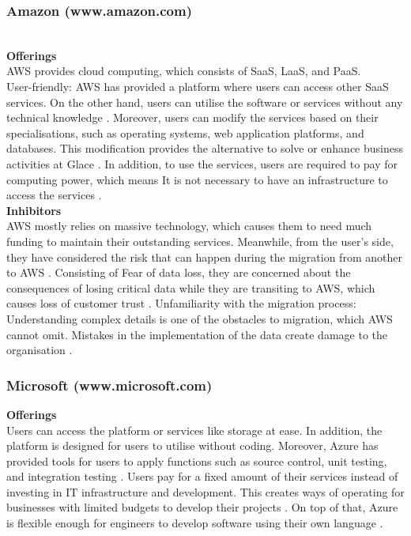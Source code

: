 \documentclass[12pt,a4paper]{article}
\begin{document}
\subsubsection{Amazon (www.amazon.com)} \\
\noindent\textbf{Offerings}\\
\noindent AWS provides cloud computing, which consists of SaaS, LaaS, and PaaS.\\ 
User-friendly: AWS has provided a platform where users can access other SaaS services. On the other hand, users can utilise the software or services without any technical knowledge \citep{question_3.5}. Moreover, users can modify the services based on their specialisations, such as operating systems, web application platforms, and databases. This modification provides the alternative to solve or enhance business activities at Glace \citep{question_3.6}. In addition, to use the services, users are required to pay for computing power, which means It is not necessary to have an infrastructure to access the services \citep{question_3.6}. \\

\noindent\textbf{Inhibitors }\\
\noindent AWS mostly relies on massive technology, which causes them to need much funding to maintain their outstanding services. Meanwhile, from the user’s side, they have considered the risk that can happen during the migration from another to AWS \citep{question_3.7}. Consisting of Fear of data loss, they are concerned about the consequences of losing critical data while they are transiting to AWS, which causes loss of customer trust \citep{question_3.7}. 
Unfamiliarity with the migration process: Understanding complex details is one of the obstacles to migration, which AWS cannot omit. Mistakes in the implementation of the data create damage to the organisation \citep{question_3.7}.


\subsubsection{Microsoft (www.microsoft.com) } 
\noindent\textbf{Offerings}\\
Users can access the platform or services like storage at ease. In addition, the platform is designed for users to utilise without coding. Moreover, Azure has provided tools for users to apply functions such as source control, unit testing, and integration testing \citep{question_3.8}. Users pay for a fixed amount of their services instead of investing in IT infrastructure and development. This creates ways of operating for businesses with limited budgets to develop their projects \citep{question_3.8}. On top of that, Azure is flexible enough for engineers to develop software using their own language \citep{question_3.8}.\\
\end{document}
